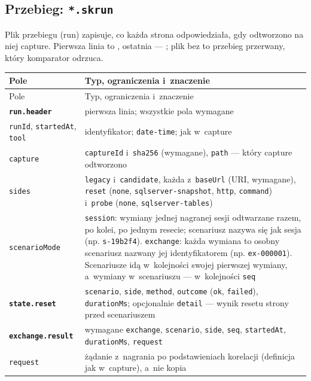 \subsection{Przebieg: \texttt{*.skrun}}\label{sec:formaty-skrun}

Plik przebiegu (run) zapisuje, co każda strona odpowiedziała, gdy odtworzono na niej capture.
Pierwsza linia to , ostatnia --- ; plik bez
 to przebieg przerwany, który komparator odrzuca.

{\small
\begin{xltabular}{\linewidth}{@{}>{\raggedright\arraybackslash}p{3.6cm} >{\raggedright\arraybackslash}X@{}}
\toprule
Pole & Typ, ograniczenia i~znaczenie \\
\midrule
\endfirsthead
\toprule
Pole & Typ, ograniczenia i~znaczenie \\
\midrule
\endhead
\bottomrule
\endlastfoot
\textbf{\texttt{run.header}} & pierwsza linia; wszystkie pola wymagane \\
\texttt{runId}, \texttt{startedAt}, \texttt{tool} & identyfikator; \texttt{date-time}; jak w~capture \\
\texttt{capture} & \texttt{captureId} i~\texttt{sha256} (wymagane), \texttt{path} --- który
capture odtworzono \\
\texttt{sides} & \texttt{legacy} i~\texttt{candidate}, każda z~\texttt{baseUrl} (URI,
wymagane), \texttt{reset} (\texttt{none}, \texttt{sqlserver-snapshot}, \texttt{http},
\texttt{command}) i~\texttt{probe} (\texttt{none}, \texttt{sqlserver-tables}) \\
\texttt{scenarioMode} & \texttt{session}: wymiany jednej nagranej sesji odtwarzane razem, po
kolei, po jednym resecie; scenariusz nazywa się jak sesja (np. \texttt{s-19b2f4}).
\texttt{exchange}: każda wymiana to osobny scenariusz nazwany jej identyfikatorem
(np. \texttt{ex-000001}). Scenariusze idą w~kolejności swojej pierwszej wymiany, a~wymiany
w~scenariuszu --- w~kolejności \texttt{seq} \\
\midrule
\textbf{\texttt{state.reset}} & \texttt{scenario}, \texttt{side}, \texttt{method},
\texttt{outcome} (\texttt{ok}, \texttt{failed}), \texttt{durationMs}; opcjonalnie
\texttt{detail} --- wynik resetu strony przed scenariuszem \\
\midrule
\textbf{\texttt{exchange.result}} & wymagane \texttt{exchange}, \texttt{scenario},
\texttt{side}, \texttt{seq}, \texttt{startedAt}, \texttt{durationMs}, \texttt{request} \\
\texttt{request} & żądanie z~nagrania po podstawieniach korelacji (definicja jak w~capture), a~nie kopia

\end{xltabular}}
